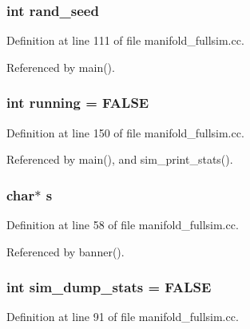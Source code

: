 \subsubsection[{rand\_\-seed}]{\setlength{\rightskip}{0pt plus 5cm}int {\bf rand\_\-seed}}\label{manifold__fullsim_8cc_b58df36fd429cab6ab2f2dedd531f7a9}




Definition at line 111 of file manifold\_\-fullsim.cc.

Referenced by main().
\subsubsection[{running}]{\setlength{\rightskip}{0pt plus 5cm}int {\bf running} = FALSE\hspace{0.3cm}{\tt  [static]}}\label{manifold__fullsim_8cc_2f45113638a0b749a8a205d2cd7fb42b}




Definition at line 150 of file manifold\_\-fullsim.cc.

Referenced by main(), and sim\_\-print\_\-stats().
\subsubsection[{s}]{\setlength{\rightskip}{0pt plus 5cm}char$\ast$ {\bf s}}\label{manifold__fullsim_8cc_b51cd24d34f6509eafb5e059f4c7d10e}




Definition at line 58 of file manifold\_\-fullsim.cc.

Referenced by banner().
\subsubsection[{sim\_\-dump\_\-stats}]{\setlength{\rightskip}{0pt plus 5cm}int {\bf sim\_\-dump\_\-stats} = FALSE}\label{manifold__fullsim_8cc_5f0267e6bed91a9151ebcc5e0a7557dc}




Definition at line 91 of file manifold\_\-fullsim.cc.

